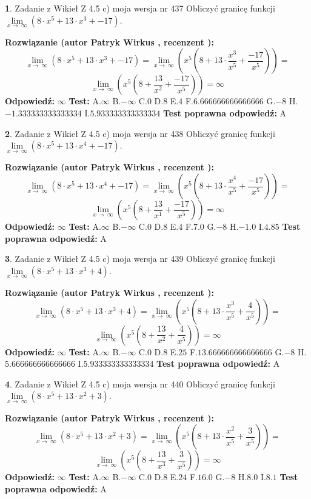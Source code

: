 \documentclass[12pt, a4paper]{article}
\theoremstyle{definition} %
\newtheorem{zad}{}
\newcommand{\zadStart}[1]{\begin{zad}#1\newline}
\newcommand{\zadStop}{\end{zad}}
\newcommand{\rozwStart}[2]{\noindent \textbf{Rozwiązanie (autor #1 , recenzent #2): }\newline}
\newcommand{\rozwStop}{\newline}
\newcommand{\odpStart}{\noindent \textbf{Odpowiedź:}\newline}
\newcommand{\odpStop}{\newline}
\newcommand{\testStart}{\noindent \textbf{Test:}\newline}
\newcommand{\testStop}{\newline}
\newcommand{\kluczStart}{\noindent \textbf{Test poprawna odpowiedź:}\newline}
\newcommand{\kluczStop}{\newline}
\begin{document}
\zadStart{Zadanie z Wikieł Z 4.5 c) moja wersja nr 437}
Obliczyć granicę funkcji  $\lim\limits_{x\to\ \infty}(8 \cdot x^{5}+13 \cdot x^{3}+-17)$.
\zadStop
\rozwStart{Patryk Wirkus}{}
$$\lim\limits_{x\to\ \infty}(8 \cdot x^{5}+13 \cdot x^{3}+-17) = \lim\limits_{x\to\ \infty}(x^{5}(8 +13 \cdot \frac{x^{3}}{x^{5}}+\frac{-17}{x^{5}})) =$$ $$\lim\limits_{x\to\ \infty}(x^{5}(8 +\frac{13}{x^{2}}+\frac{-17}{x^{5}})) =\infty$$
\rozwStop
\odpStart
$\infty$
\odpStop
\testStart
A.$\infty$ B.$-\infty$ C.$0$ D.$8$ E.$4$
F.$6.666666666666666$ G.$-8$
H.$-1.333333333333334$
I.$5.933333333333334$
\testStop
\kluczStart
A
\kluczStop



\zadStart{Zadanie z Wikieł Z 4.5 c) moja wersja nr 438}
Obliczyć granicę funkcji  $\lim\limits_{x\to\ \infty}(8 \cdot x^{5}+13 \cdot x^{4}+-17)$.
\zadStop
\rozwStart{Patryk Wirkus}{}
$$\lim\limits_{x\to\ \infty}(8 \cdot x^{5}+13 \cdot x^{4}+-17) = \lim\limits_{x\to\ \infty}(x^{5}(8 +13 \cdot \frac{x^{4}}{x^{5}}+\frac{-17}{x^{5}})) =$$ $$\lim\limits_{x\to\ \infty}(x^{5}(8 +\frac{13}{x^{1}}+\frac{-17}{x^{5}})) =\infty$$
\rozwStop
\odpStart
$\infty$
\odpStop
\testStart
A.$\infty$ B.$-\infty$ C.$0$ D.$8$ E.$4$
F.$7.0$ G.$-8$
H.$-1.0$
I.$4.85$
\testStop
\kluczStart
A
\kluczStop



\zadStart{Zadanie z Wikieł Z 4.5 c) moja wersja nr 439}
Obliczyć granicę funkcji  $\lim\limits_{x\to\ \infty}(8 \cdot x^{5}+13 \cdot x^{3}+4)$.
\zadStop
\rozwStart{Patryk Wirkus}{}
$$\lim\limits_{x\to\ \infty}(8 \cdot x^{5}+13 \cdot x^{3}+4) = \lim\limits_{x\to\ \infty}(x^{5}(8 +13 \cdot \frac{x^{3}}{x^{5}}+\frac{4}{x^{5}})) =$$ $$\lim\limits_{x\to\ \infty}(x^{5}(8 +\frac{13}{x^{2}}+\frac{4}{x^{5}})) =\infty$$
\rozwStop
\odpStart
$\infty$
\odpStop
\testStart
A.$\infty$ B.$-\infty$ C.$0$ D.$8$ E.$25$
F.$13.666666666666666$ G.$-8$
H.$5.666666666666666$
I.$5.933333333333334$
\testStop
\kluczStart
A
\kluczStop



\zadStart{Zadanie z Wikieł Z 4.5 c) moja wersja nr 440}
Obliczyć granicę funkcji  $\lim\limits_{x\to\ \infty}(8 \cdot x^{5}+13 \cdot x^{2}+3)$.
\zadStop
\rozwStart{Patryk Wirkus}{}
$$\lim\limits_{x\to\ \infty}(8 \cdot x^{5}+13 \cdot x^{2}+3) = \lim\limits_{x\to\ \infty}(x^{5}(8 +13 \cdot \frac{x^{2}}{x^{5}}+\frac{3}{x^{5}})) =$$ $$\lim\limits_{x\to\ \infty}(x^{5}(8 +\frac{13}{x^{3}}+\frac{3}{x^{5}})) =\infty$$
\rozwStop
\odpStart
$\infty$
\odpStop
\testStart
A.$\infty$ B.$-\infty$ C.$0$ D.$8$ E.$24$
F.$16.0$ G.$-8$
H.$8.0$
I.$8.1$
\testStop
\kluczStart
A
\kluczStop
\end{document}

